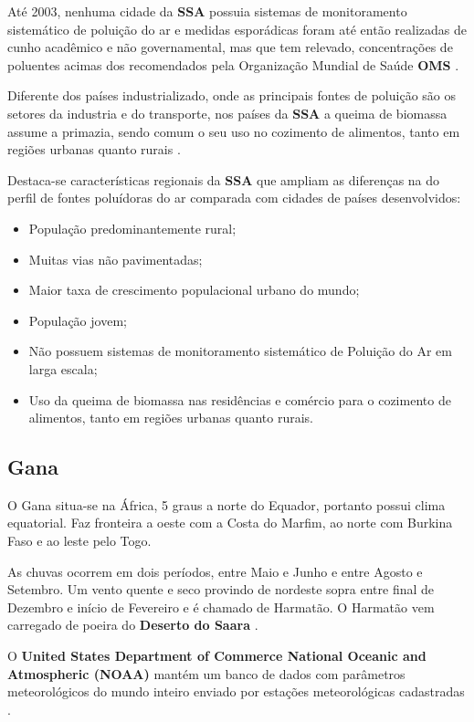 Até 2003, nenhuma cidade da \textbf{SSA} possuia sistemas de monitoramento 
sistemático de poluição do ar e medidas esporádicas foram até então realizadas
de cunho acadêmico e não governamental, mas que tem relevado, concentrações
de poluentes acimas dos recomendados pela Organização Mundial de Saúde \textbf{OMS} 
\citep{EZZATI2004}. 

Diferente dos países industrializado, onde as principais fontes de poluição 
são os setores da industria e do transporte, nos países da \textbf{SSA} a 
queima de biomassa assume a primazia, sendo comum o seu uso no cozimento 
de alimentos, tanto em regiões urbanas quanto rurais \citep{SMITH2004}. 

Destaca-se características regionais da \textbf{SSA} que ampliam as diferenças 
na do perfil de fontes poluídoras do ar comparada com cidades de países desenvolvidos: 

\begin{itemize}
  \item População predominantemente rural;
  \item Muitas vias não pavimentadas;
  \item Maior taxa de crescimento populacional urbano do mundo;
  \item População jovem;
  \item Não possuem sistemas de monitoramento sistemático de Poluição do Ar em larga escala;
  \item Uso da queima de biomassa nas residências e comércio para o cozimento de alimentos,
        tanto em regiões urbanas quanto rurais.
\end{itemize}

\subsection{Gana}

O Gana situa-se na África, 5 graus a norte do Equador, portanto possui clima
equatorial. Faz fronteira a oeste com a Costa do Marfim, ao norte com Burkina 
Faso e ao leste pelo Togo. 

As chuvas ocorrem em dois períodos, entre Maio e Junho e entre Agosto e Setembro.
Um vento quente e seco provindo de nordeste sopra entre final de Dezembro
e início de Fevereiro e é chamado de Harmatão. O Harmatão vem carregado de 
poeira do \textbf{Deserto do Saara} \citep{breuning2005}.

O \textbf{United States Department of Commerce National Oceanic 
and Atmospheric (NOAA)} mantém um banco de dados com parâmetros 
meteorológicos do mundo inteiro enviado por estações meteorológicas 
cadastradas \citep{noaa}. 

